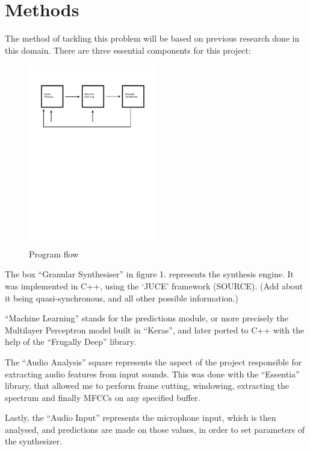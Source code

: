 \chapter{Methods}
\label{chap:meth}


The method of tackling this problem will be based on previous research
done in this domain. There are three essential components for this
project:

\begin{figure}[h]
\caption{Program flow}
\centering
\includegraphics[width=0.5\textwidth]{images/flowchart}
\end{figure}

The box ``Granular Synthesiser'' in figure 1. represents the synthesis
engine. It was implemented in C++, using the `JUCE' framework
(SOURCE). (Add about it being quasi-synchronous, and all other
possible information.)

``Machine Learning'' stands for the predictions module, or more
precisely the Multilayer Perceptron model built in ``Keras'', and
later ported to C++ with the help of the ``Frugally Deep'' library.

The ``Audio Analysis'' square represents the aspect of the
project responsible for extracting audio features from input
sounds. This was done with the ``Essentia'' library, that allowed me
to perform frame cutting, windowing, extracting the spectrum and
finally MFCCs on any specified buffer.

Lastly, the ``Audio Input'' represents the microphone input, which is then
analysed, and predictions are made on those values, in order to set
parameters of the synthesizer.

